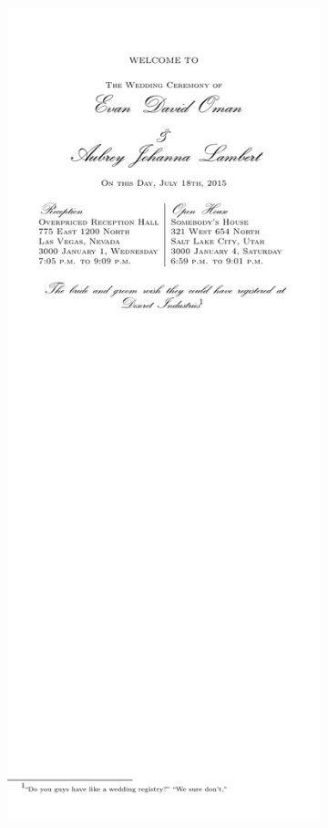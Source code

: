 \documentclass[12pt]{article}
\begin{document}
\begin{figure}[h]
	\centering
	\begin{subfigure}[b]{0.4\textwidth}
			\includegraphics[width=.5\textwidth]{program}
	\end{subfigure}
	\begin{subfigure}[b]{0.4\textwidth}

\end{subfigure}
\end{figure}
\end{document}
